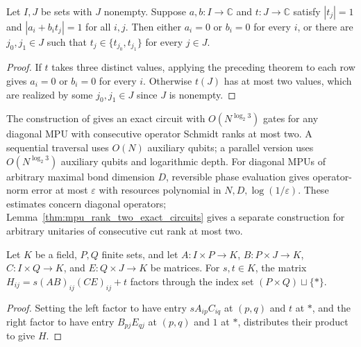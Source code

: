 \begin{lemma}
    \label{thm:mpu_circle_factorization}
    \leanok
    Let $I,J$ be sets with $J$ nonempty. Suppose $a,b:I\to\mathbb C$
    and $t:J\to\mathbb C$ satisfy $|t_j|=1$ and $|a_i+b_it_j|=1$
    for all $i,j$. Then either $a_i=0$ or $b_i=0$ for every $i$, or
    there are $j_0,j_1\in J$ such that $t_j\in\{t_{j_0},t_{j_1}\}$
    for every $j\in J$.
\end{lemma}
\begin{proof}\leanok
    If $t$ takes three distinct values, applying the preceding theorem to
    each row gives $a_i=0$ or $b_i=0$ for every $i$. Otherwise $t(J)$ has
    at most two values, which are realized by some $j_0,j_1\in J$ since
    $J$ is nonempty.
\end{proof}

The construction of \cite{DiagonalMPUCircuits2026} gives an exact circuit with $O(N^{\log_2 3})$ gates for
any diagonal MPU with consecutive operator Schmidt ranks at most two.
A sequential traversal uses $O(N)$ auxiliary qubits; a parallel version
uses $O(N^{\log_2 3})$ auxiliary qubits and logarithmic depth.
For diagonal MPUs of arbitrary maximal bond dimension $D$, reversible
phase evaluation gives operator-norm error at most $\varepsilon$ with
resources polynomial in $N,D,\log(1/\varepsilon)$. These estimates concern diagonal operators;
Lemma~\ref{thm:mpu_rank_two_exact_circuits} gives a separate construction
for arbitrary unitaries of consecutive cut rank at most two.

\begin{lemma}
    \label{thm:mpu_phase_selector_factorization}
    \leanok
    Let $K$ be a field, $P,Q$ finite sets, and let
    $A:I\times P\to K$, $B:P\times J\to K$,
    $C:I\times Q\to K$, and $E:Q\times J\to K$ be matrices.
    For $s,t\in K$, the matrix
    $H_{ij}=s(AB)_{ij}(CE)_{ij}+t$ factors through the index set
    $(P\times Q)\sqcup\{*\}$.
\end{lemma}
\begin{proof}\leanok
    Setting the left factor to have entry $sA_{ip}C_{iq}$ at $(p,q)$ and
    $t$ at $*$, and the right factor to have entry $B_{pj}E_{qj}$ at
    $(p,q)$ and $1$ at $*$, distributes their product to give $H$.
\end{proof}

